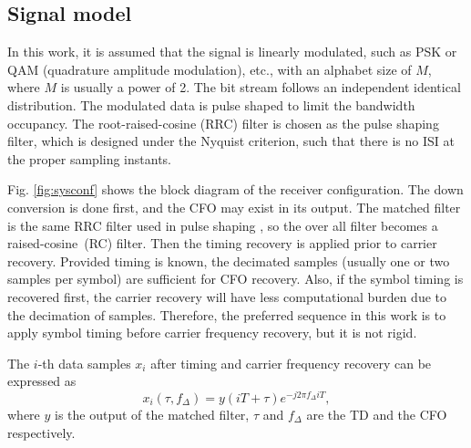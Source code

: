 \documentclass[journal,comsoc]{IEEEtran}
\begin{document}
\subsection{Signal model }  


In this work, it is assumed that the signal is linearly modulated, such as PSK or QAM (quadrature amplitude modulation), etc., with an alphabet size of \(M\), where \(M\) is usually a power of 2.
The bit stream follows an independent identical distribution.
The modulated data is pulse shaped to limit the bandwidth occupancy.
The root-raised-cosine (RRC) filter is chosen as the pulse shaping filter, which is designed under the Nyquist criterion, 
such that there is no ISI at the proper sampling instants.



Fig. \ref{fig:sysconf} shows the block diagram of the receiver configuration.
The down conversion is done first, and the CFO may exist in its output.
The matched filter is the same RRC filter used in pulse shaping , so the over all filter becomes a raised-cosine~(RC) filter. 
Then the timing recovery is applied prior to carrier recovery.
Provided timing is known, the decimated samples (usually one or two samples per symbol) are sufficient for CFO recovery.
Also, if the symbol timing is recovered first, the carrier recovery will have less computational burden due to the decimation of samples.
Therefore, the preferred sequence in this work is to apply symbol timing before carrier frequency recovery, but it is not rigid.

The $i$-th data samples \(x_i\) after timing and carrier frequency recovery can be expressed as
\begin{equation}
{x_i}( \tau ,{f_\Delta }) = y(iT +  \tau ){e^{ - j2\pi {f_\Delta }iT}},
\end{equation}
where \(y\) is the output of the matched filter, \(\tau\) and \(f_\Delta\) are the TD and the CFO respectively.
\end{document}
